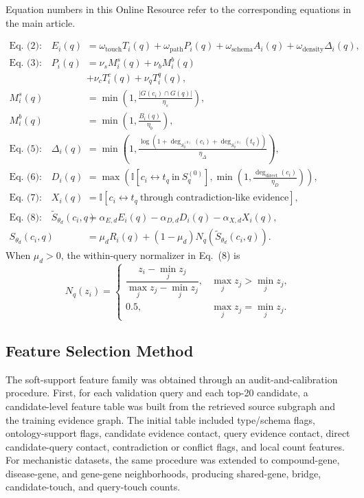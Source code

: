 \documentclass[11pt]{article}
\newcommand{\mainequation}[1]{Eq.~(#1)}
\begin{document}
    Equation numbers in this Online Resource refer to the corresponding equations in the main article.

    \[
    \begin{aligned}
    \text{Eq. (2):}\quad
    E_i(q)&=\omega_{\mathrm{touch}}T_i(q)+\omega_{\mathrm{path}}P_i(q)
    +\omega_{\mathrm{schema}}A_i(q)+\omega_{\mathrm{density}}\Delta_i(q),\\
    \text{Eq. (3):}\quad
    P_i(q)&=\nu_sM^s_i(q)+\nu_bM^b_i(q)\\
    &+\nu_cT^c_i(q)+\nu_qT^q_i(q),\\
    M^s_i(q)&=\min\!\left(1,\frac{|G(c_i)\cap G(q)|}{\eta_s}\right),\\
    M^b_i(q)&=\min\!\left(1,\frac{B_i(q)}{\eta_b}\right),\\
    \text{Eq. (5):}\quad
    \Delta_i(q)&=\min\!\left(1,\frac{\log(1+\deg_{S^{(0)}_q}(c_i)+\deg_{S^{(0)}_q}(t_q))}{\eta_\Delta}\right),\\
    \text{Eq. (6):}\quad
    D_i(q)&=\max\!\left(\mathbb{I}[c_i\leftrightarrow t_q\ \text{in}\ S^{(0)}_q],
    \min\!\left(1,\frac{\deg_{\mathrm{direct}}(c_i)}{\eta_D}\right)\right),\\
    \text{Eq. (7):}\quad
    X_i(q)&=\mathbb{I}[c_i\leftrightarrow t_q\ \text{through contradiction-like evidence}],\\
    \text{Eq. (8):}\quad
    \widetilde{S}_{\theta_d}(c_i,q)&=
    \alpha_{E,d}E_i(q)-\alpha_{D,d}D_i(q)-\alpha_{X,d}X_i(q),\\
    S_{\theta_d}(c_i,q)&=\mu_dR_i(q)+(1-\mu_d)N_q(\widetilde{S}_{\theta_d}(c_i,q)).
    \end{aligned}
    \]
    When \(\mu_d>0\), the within-query normalizer in \mainequation{8} is
    \[
    N_q(z_i)=
    \begin{cases}
    \dfrac{z_i-\min_jz_j}{\max_jz_j-\min_jz_j}, & \max_jz_j>\min_jz_j,\\[0.7em]
    0.5, & \max_jz_j=\min_jz_j.
    \end{cases}
    \]

    \subsection{Feature Selection Method}

    The soft-support feature family was obtained through an audit-and-calibration procedure. First, for each validation query and each top-20 candidate, a candidate-level feature table was built from the retrieved source subgraph and the training evidence graph. The initial table included type/schema flags, ontology-support flags, candidate evidence contact, query evidence contact, direct candidate-query contact, contradiction or conflict flags, and local count features. For mechanistic datasets, the same procedure was extended to compound-gene, disease-gene, and gene-gene neighborhoods, producing shared-gene, bridge, candidate-touch, and query-touch counts.
\end{document}
